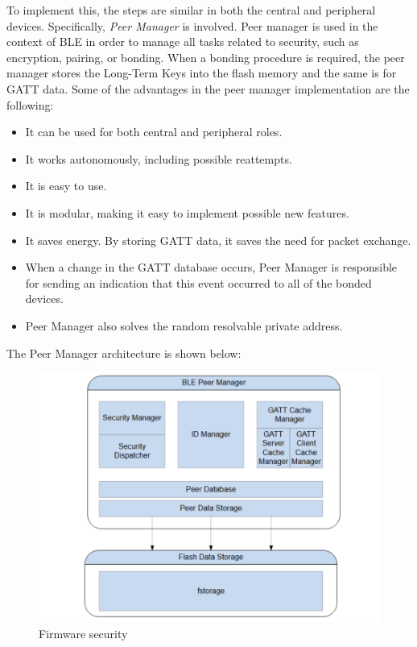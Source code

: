 \documentclass{Configuration_Files/PoliMi3i_thesis}
\begin{document}
To implement this, the steps are similar in both the central and peripheral devices. Specifically, \textit{Peer Manager} is involved. Peer manager is used in the context of BLE in order to manage all tasks related to security, such as encryption, pairing, or bonding. When a bonding procedure is required, the peer manager stores the Long-Term Keys into the flash memory and the same is for GATT data. Some of the advantages in the peer manager implementation are the following:

\begin{itemize}
    \item It can be used for both central and peripheral roles.
    \item It works autonomously, including possible reattempts.
    \item It is easy to use.
    \item It is modular, making it easy to implement possible new features.
    \item It saves energy. By storing GATT data, it saves the need for packet exchange.
    \item When a change in the GATT database occurs, Peer Manager is responsible for sending an indication that this event occurred to all of the bonded devices.
    \item Peer Manager also solves the random resolvable private address.
\end{itemize}

The Peer Manager architecture is shown below:

\begin{figure}[h]
    \centering
    \includegraphics[scale=0.3]{Firmware_security/Screenshot 2024-07-22 at 22.33.12.png}
    \caption{Firmware security}
    \label{firm_sec_1}
\end{figure}
\end{document}
